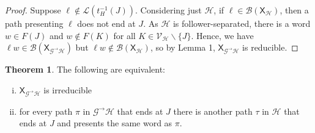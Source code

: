 \documentclass{article}
\newcommand{\Lc}{\mathcal{L}}  %
\newcommand{\Gc}{\mathcal{G}}  %
\newcommand{\Hc}{\mathcal{H}}  %
\newcommand{\Vc}{\mathcal{V}}
\newcommand{\Bc}{\mathcal{B}}
\newcommand{\GtH}{\Gc^\to\Hc}
\newcommand{\shift}[1]{\mathsf{X}_{#1}}
\theoremstyle{definition}
\newtheorem{theorem}{Theorem}
\begin{document}
\begin{proof}
    Suppose \(\ell \notin \Lc(t^{-1}_H(J))\). Considering just \(\Hc\), 
    if \(\ell \in \Bc(\shift{\Hc})\), then a path presenting \(\ell\) does not 
    end at \(J\). As \(\Hc\) is follower-separated, there is a word 
    \(w \in F(J)\) and \(w \notin F(K)\) for all \(K \in \Vc_\Hc \backslash \{J\}\). 
    Hence, we have \(\ell w \in \Bc(\shift{\GtH})\) but \(\ell w \notin \Bc(\shift{\Hc})\), 
    so by Lemma 1, \(\shift{\GtH}\) is reducible.
\end{proof}

\begin{theorem}
    The following are equivalent:

    \begin{enumerate}[(i)]
        \item \(\shift{\GtH}\) is irreducible
        \item for every path \(\pi\) in \(\GtH\) that ends at \(J\) there is another path
        \(\tau\) in \(\Hc\) that ends at \(J\) and presents the same word as \(\pi\).
    \end{enumerate}
\end{theorem}
\end{document}
